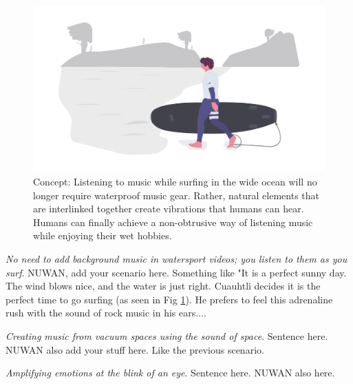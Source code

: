 \documentclass[acmtog]{acmart}
\begin{document}
\begin{figure}[h]
  \centering
  \includegraphics[width=\linewidth]{acmart-master-2/samples/surfbnw.png}
  \caption{Concept: Listening to music while surfing in the wide ocean will no longer require waterproof music gear. Rather, natural elements that are interlinked together create vibrations that humans can hear. Humans can finally achieve a non-obtrusive way of listening music while enjoying their wet hobbies. }
  \label{fig: surf}
\end{figure}
\textit{No need to add background music in watersport videos; you listen to them as you surf}. NUWAN, add your scenario here. Something like "It is a perfect sunny day. The wind blows nice, and the water is just right. Cuauhtli decides it is the perfect time to go surfing (as seen in Fig \ref{fig: surf}). He prefers to feel this adrenaline rush with the sound of rock music in his ears.... 


\textit{Creating music from vacuum spaces using the sound of space}. Sentence here. 
NUWAN also add your stuff here. Like the previous scenario. 

\textit{Amplifying emotions at the blink of an eye}. Sentence here. 
NUWAN also here. 
\end{document}
